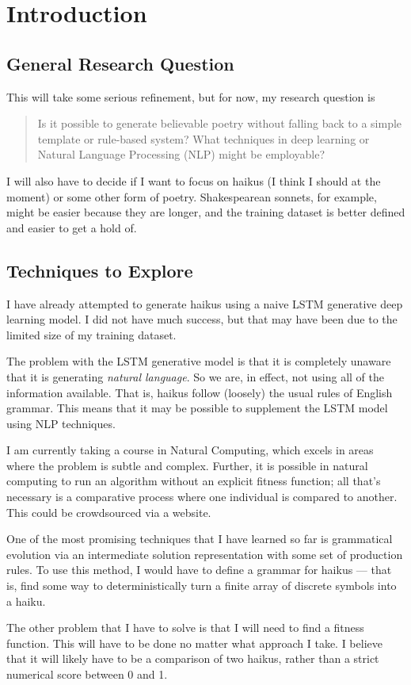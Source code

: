 \section{Introduction}\label{sec:introduction}

\subsection{General Research Question}\label{sec:research-question}

This will take some serious refinement, but for now, my research question is

\begin{quote}
    Is it possible to generate believable poetry without falling back to a simple template or rule-based system?
    What techniques in deep learning or Natural Language Processing (NLP) might be employable?
\end{quote}

I will also have to decide if I want to focus on haikus (I think I should at the moment) or some other form of poetry.
Shakespearean sonnets, for example, might be easier because they are longer, and the training dataset is better defined and easier to get a hold of.

\subsection{Techniques to Explore}\label{sec:techniques-to-explore}

I have already attempted to generate haikus using a naive LSTM generative deep learning model.
I did not have much success, but that may have been due to the limited size of my training dataset.

The problem with the LSTM generative model is that it is completely unaware that it is generating \textit{natural language}.
So we are, in effect, not using all of the information available.
That is, haikus follow (loosely) the usual rules of English grammar.
This means that it may be possible to supplement the LSTM model using NLP techniques.

I am currently taking a course in Natural Computing, which excels in areas where the problem is subtle and complex.
Further, it is possible in natural computing to run an algorithm without an explicit fitness function; all that's necessary is a comparative process where one individual is compared to another.
This could be crowdsourced via a website.

One of the most promising techniques that I have learned so far is grammatical evolution via an intermediate solution representation with some set of production rules.
To use this method, I would have to define a grammar for haikus --- that is, find some way to deterministically turn a finite array of discrete symbols into a haiku.

The other problem that I have to solve is that I will need to find a fitness function.
This will have to be done no matter what approach I take.
I believe that it will likely have to be a comparison of two haikus, rather than a strict numerical score between 0 and 1.
